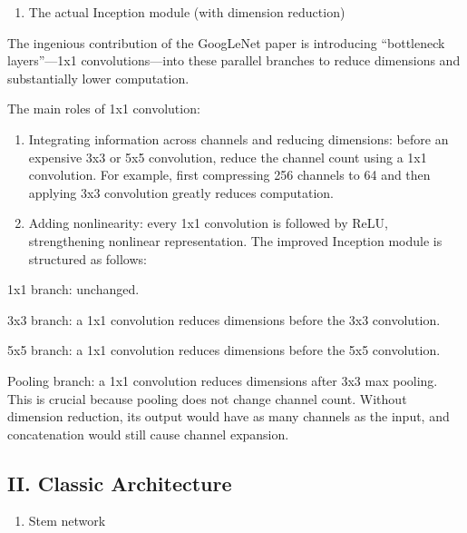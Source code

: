 \begin{enumerate}
\def\labelenumi{\arabic{enumi}.}
\setcounter{enumi}{1}
\tightlist
\item
  The actual Inception module (with dimension reduction)
\end{enumerate}

The ingenious contribution of the GoogLeNet paper is introducing ``bottleneck layers''---1x1 convolutions---into these parallel branches to reduce dimensions and substantially lower computation.

The main roles of 1x1 convolution:

\begin{enumerate}
\def\labelenumi{(\arabic{enumi})}
\item
  Integrating information across channels and reducing dimensions: before an expensive 3x3 or 5x5 convolution, reduce the channel count using a 1x1 convolution. For example, first compressing 256 channels to 64 and then applying 3x3 convolution greatly reduces computation.
\item
{}
  Adding nonlinearity: every 1x1 convolution is followed by ReLU, strengthening nonlinear representation. The improved Inception module is structured as follows:
\end{enumerate}

1x1 branch: unchanged.

3x3 branch: a 1x1 convolution reduces dimensions before the 3x3 convolution.

5x5 branch: a 1x1 convolution reduces dimensions before the 5x5 convolution.

Pooling branch: a 1x1 convolution reduces dimensions after 3x3 max pooling. This is crucial because pooling does not change channel count. Without dimension reduction, its output would have as many channels as the input, and concatenation would still cause channel expansion.

\hypertarget{ii.-classic-architecture}{%
\subsection{II. Classic Architecture}\label{ii.-classic-architecture}}

\begin{enumerate}
\def\labelenumi{\arabic{enumi}.}
\tightlist
\item
  Stem network
\end{enumerate}

